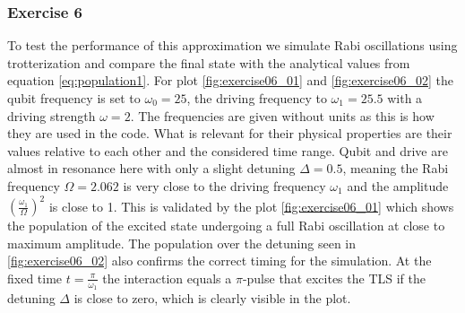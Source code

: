 \subsubsection{Exercise 6}
To test the performance of this approximation we simulate Rabi oscillations using trotterization and compare the final state with the analytical values from equation \eqref{eq:population1}. For plot \ref{fig:exercise06_01} and \ref{fig:exercise06_02} the qubit frequency is set to $\omega_0 = 25$, the driving frequency to $\omega_1 = 25.5$ with a driving strength $\omega = 2$. The frequencies are given without units as this is how they are used in the code. What is relevant for their physical properties are their values relative to each other and the considered time range. Qubit and drive are almost in resonance here with only a slight detuning $\Delta = 0.5$, meaning the Rabi frequency $\Omega = 2.062$ is very close to the driving frequency $\omega_1$ and the amplitude $\left(\frac{\omega_1}{\Omega}\right)^2$ is close to 1. This is validated by the plot \ref{fig:exercise06_01} which shows the population of the excited state undergoing a full Rabi oscillation at close to maximum amplitude. The population over the detuning seen in \ref{fig:exercise06_02} also confirms the correct timing for the simulation. At the fixed time $t = \frac{\pi}{\omega_1}$ the interaction equals a $\pi$-pulse that excites the TLS if the detuning $\Delta$ is close to zero, which is clearly visible in the plot.
